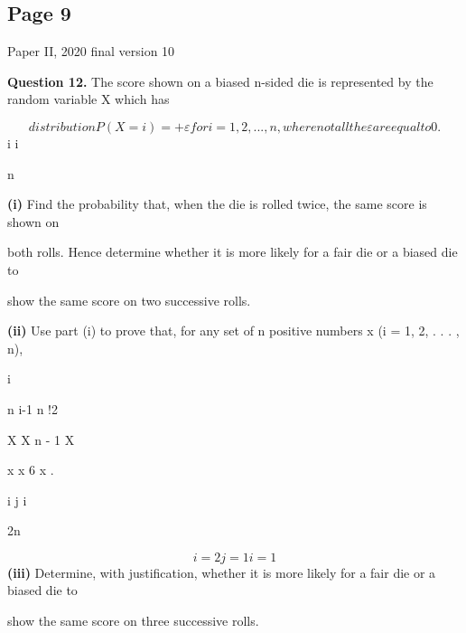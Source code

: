 \documentclass[12pt]{article}
\begin{document}
\subsection*{Page 9}
\begin{flushleft}
Paper II, 2020 final version 10\par
\bigskip\textbf{Question 12.} The score shown on a biased n-sided die is represented by the random variable X which has\par
\[distribution P(X = i) = + ε for i = 1, 2, . . . , n, where not all the ε are equal to 0.\]
i i\par
n\par
\textbf{(i)} Find the probability that, when the die is rolled twice, the same score is shown on\par
both rolls. Hence determine whether it is more likely for a fair die or a biased die to\par
show the same score on two successive rolls.\par
\textbf{(ii)} Use part (i) to prove that, for any set of n positive numbers x (i = 1, 2, . . . , n),\par
i\par
n i-1 n !2\par
X X n - 1 X\par
x x 6 x .\par
i j i\par
2n\par
\[i=2 j=1 i=1\]
\textbf{(iii)} Determine, with justification, whether it is more likely for a fair die or a biased die to\par
show the same score on three successive rolls.\par
\end{flushleft}
\end{document}
